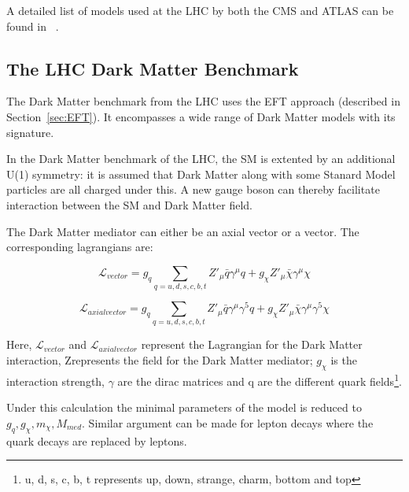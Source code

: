 A detailed list of models used at the LHC by both the CMS and ATLAS can be found in ~\cite{Abercrombie_2020}.



\subsection{The LHC Dark Matter Benchmark}
\label{sec:LHCDM}
The Dark Matter benchmark from the LHC uses the EFT approach (described in Section~\ref{sec:EFT}). It encompasses a wide range of Dark Matter models with its signature. 

In the Dark Matter benchmark of the LHC, the SM is extented by an additional U(1) symmetry: it is assumed that Dark Matter along with some Stanard Model particles are all charged under this. A new gauge boson can thereby facilitate interaction between the SM and Dark Matter field. 

The Dark Matter mediator can either be an axial vector or a vector. The corresponding lagrangians are:

\begin{equation}
\mathcal{L}_{vector}= g_{q} \sum_{q=u,d,s,c,b,t} Z'_{\mu}\bar{q}\gamma^{\mu}q + g_{\chi}Z'_{\mu}\bar{\chi}\gamma^{\mu}\chi
\end{equation}

\begin{equation}
\mathcal{L}_{axial vector}= g_{q} \sum_{q=u,d,s,c,b,t} Z'_{\mu}\bar{q}\gamma^{\mu}\gamma^{5}q + g_{\chi}Z'_{\mu}\bar{\chi}\gamma^{\mu}\gamma^{5}\chi
\end{equation}

Here, $\mathcal{L}_{vector}$ and $\mathcal{L}_{axial vector}$ represent the Lagrangian for the Dark Matter interaction, Z\prime represents the field for the Dark Matter mediator; $g_{\chi}$ is the interaction strength, $\gamma$ are the dirac matrices and q are the different quark fields\footnote{u, d, s, c, b, t represents up, down, strange, charm, bottom and top}.

Under this calculation the minimal parameters of the model is reduced to ${g_{q}, g_{\chi}, m_{\chi}, M_{med}}$. 
Similar argument can be made for lepton decays where the quark decays are replaced by leptons. 

